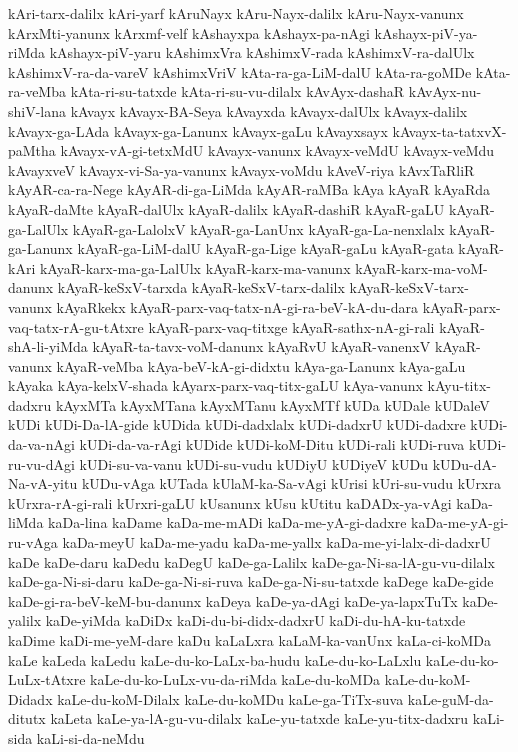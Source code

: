 {kAri-tarx-dalilx
kAri-yarf
kAruNayx
kAru-Nayx-dalilx
kAru-Nayx-vanunx
kArxMti-yanunx
kArxmf-velf
kAshayxpa
kAshayx-pa-nAgi
kAshayx-piV-ya-riMda
kAshayx-piV-yaru
kAshimxVra
kAshimxV-rada
kAshimxV-ra-dalUlx
kAshimxV-ra-da-vareV
kAshimxVriV
kAta-ra-ga-LiM-dalU
kAta-ra-goMDe
kAta-ra-veMba
kAta-ri-su-tatxde
kAta-ri-su-vu-dilalx
kAvAyx-dashaR
kAvAyx-nu-shiV-lana
kAvayx
kAvayx-BA-Seya
kAvayxda
kAvayx-dalUlx
kAvayx-dalilx
kAvayx-ga-LAda
kAvayx-ga-Lanunx
kAvayx-gaLu
kAvayxsayx
kAvayx-ta-tatxvX-paMtha
kAvayx-vA-gi-tetxMdU
kAvayx-vanunx
kAvayx-veMdU
kAvayx-veMdu
kAvayxveV
kAvayx-vi-Sa-ya-vanunx
kAvayx-voMdu
kAveV-riya
kAvxTaRliR
kAyAR-ca-ra-Nege
kAyAR-di-ga-LiMda
kAyAR-raMBa
kAya
kAyaR
kAyaRda
kAyaR-daMte
kAyaR-dalUlx
kAyaR-dalilx
kAyaR-dashiR
kAyaR-gaLU
kAyaR-ga-LalUlx
kAyaR-ga-LalolxV
kAyaR-ga-LanUnx
kAyaR-ga-La-nenxlalx
kAyaR-ga-Lanunx
kAyaR-ga-LiM-dalU
kAyaR-ga-Lige
kAyaR-gaLu
kAyaR-gata
kAyaR-kAri
kAyaR-karx-ma-ga-LalUlx
kAyaR-karx-ma-vanunx
kAyaR-karx-ma-voM-danunx
kAyaR-keSxV-tarxda
kAyaR-keSxV-tarx-dalilx
kAyaR-keSxV-tarx-vanunx
kAyaRkekx
kAyaR-parx-vaq-tatx-nA-gi-ra-beV-kA-du-dara
kAyaR-parx-vaq-tatx-rA-gu-tAtxre
kAyaR-parx-vaq-titxge
kAyaR-sathx-nA-gi-rali
kAyaR-shA-li-yiMda
kAyaR-ta-tavx-voM-danunx
kAyaRvU
kAyaR-vanenxV
kAyaR-vanunx
kAyaR-veMba
kAya-beV-kA-gi-didxtu
kAya-ga-Lanunx
kAya-gaLu
kAyaka
kAya-kelxV-shada
kAyarx-parx-vaq-titx-gaLU
kAya-vanunx
kAyu-titx-dadxru
kAyxMTa
kAyxMTana
kAyxMTanu
kAyxMTf
kUDa
kUDale
kUDaleV
kUDi
kUDi-Da-lA-gide
kUDida
kUDi-dadxlalx
kUDi-dadxrU
kUDi-dadxre
kUDi-da-va-nAgi
kUDi-da-va-rAgi
kUDide
kUDi-koM-Ditu
kUDi-rali
kUDi-ruva
kUDi-ru-vu-dAgi
kUDi-su-va-vanu
kUDi-su-vudu
kUDiyU
kUDiyeV
kUDu
kUDu-dA-Na-vA-yitu
kUDu-vAga
kUTada
kUlaM-ka-Sa-vAgi
kUrisi
kUri-su-vudu
kUrxra
kUrxra-rA-gi-rali
kUrxri-gaLU
kUsanunx
kUsu
kUtitu
kaDADx-ya-vAgi
kaDa-liMda
kaDa-lina
kaDame
kaDa-me-mADi
kaDa-me-yA-gi-dadxre
kaDa-me-yA-gi-ru-vAga
kaDa-meyU
kaDa-me-yadu
kaDa-me-yallx
kaDa-me-yi-lalx-di-dadxrU
kaDe
kaDe-daru
kaDedu
kaDegU
kaDe-ga-Lalilx
kaDe-ga-Ni-sa-lA-gu-vu-dilalx
kaDe-ga-Ni-si-daru
kaDe-ga-Ni-si-ruva
kaDe-ga-Ni-su-tatxde
kaDege
kaDe-gide
kaDe-gi-ra-beV-keM-bu-danunx
kaDeya
kaDe-ya-dAgi
kaDe-ya-lapxTuTx
kaDe-yalilx
kaDe-yiMda
kaDiDx
kaDi-du-bi-didx-dadxrU
kaDi-du-hA-ku-tatxde
kaDime
kaDi-me-yeM-dare
kaDu
kaLaLxra
kaLaM-ka-vanUnx
kaLa-ci-koMDa
kaLe
kaLeda
kaLedu
kaLe-du-ko-LaLx-ba-hudu
kaLe-du-ko-LaLxlu
kaLe-du-ko-LuLx-tAtxre
kaLe-du-ko-LuLx-vu-da-riMda
kaLe-du-koMDa
kaLe-du-koM-Didadx
kaLe-du-koM-Dilalx
kaLe-du-koMDu
kaLe-ga-TiTx-suva
kaLe-guM-da-ditutx
kaLeta
kaLe-ya-lA-gu-vu-dilalx
kaLe-yu-tatxde
kaLe-yu-titx-dadxru
kaLi-sida
kaLi-si-da-neMdu
}
